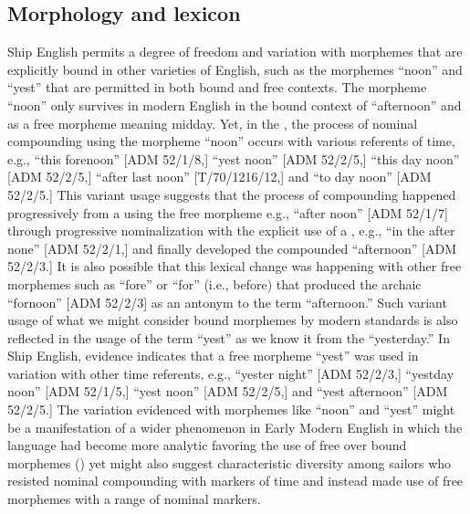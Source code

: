 \subsection{{Morphology and lexicon}}%

Ship English permits a degree of freedom and variation with morphemes that are explicitly bound in other varieties of English, such as the morphemes “noon” and “yest” that are permitted in both bound and free contexts. The morpheme “noon” only survives in modern English in the bound context of “afternoon” and as a free morpheme meaning midday. Yet, in the , the process of nominal compounding using the morpheme “noon” occurs with various referents of time, e.g., “this forenoon” [ADM 52/1/8,] “yest noon” [ADM 52/2/5,] “this day noon” [ADM 52/2/5,] “after last noon” [T/70/1216/12,] and “to day noon” [ADM 52/2/5.] This variant usage suggests that the process of compounding happened progressively from a  using the free morpheme e.g., “after noon” [ADM 52/1/7] through progressive nominalization with the explicit use of a , e.g., “in the after none” [ADM 52/2/1,] and finally developed the compounded  “afternoon” [ADM 52/2/3.] It is also possible that this lexical change was happening with other free morphemes such as “fore” or “for” (i.e., before) that produced the archaic  “fornoon” [ADM 52/2/3] as an antonym to the term “afternoon.” Such variant usage of what we might consider bound morphemes by modern standards is also reflected in the usage of the term “yest” as we know it from the  “yesterday.”  In Ship English, evidence indicates that a free morpheme “yest” was used in variation with other time referents, e.g., “yester night” [ADM 52/2/3,] “yestday noon” [ADM 52/1/5,] “yest noon” [ADM 52/2/5,] and “yest afternoon” [ADM 52/2/5.] The variation evidenced with morphemes like “noon” and “yest” might be a manifestation of a wider phenomenon in Early Modern English in which the language had become more analytic favoring the use of free over bound morphemes (\citealt{MillwardHayes2012}) yet might also suggest characteristic diversity among sailors who resisted nominal compounding with markers of time and instead made use of free morphemes with a range of nominal markers.  

